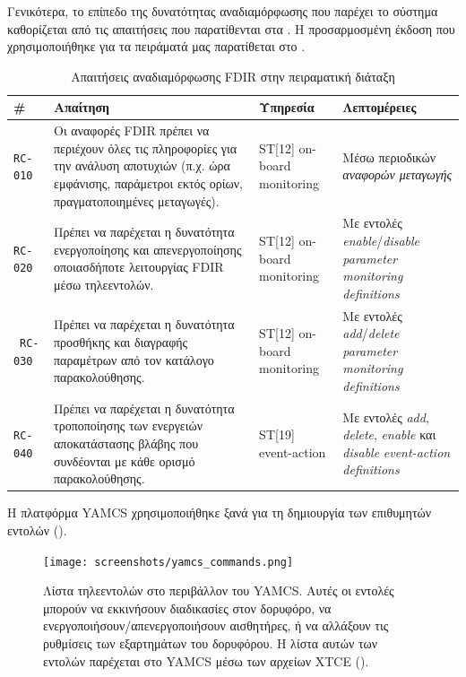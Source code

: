 \documentclass[a4paper,nobib]{tufte-book}
\begin{document}
Γενικότερα, το επίπεδο της δυνατότητας αναδιαμόρφωσης που παρέχει το σύστημα καθορίζεται από τις απαιτήσεις που παρατίθενται στα \cite{ECSS-E-ST-70-11C,SAVOIR-HB-003}. Η προσαρμοσμένη έκδοση που χρησιμοποιήθηκε για τα πειράματά μας παρατίθεται στο .

\begin{table}[h]
	\centering
	\caption{Απαιτήσεις αναδιαμόρφωσης \ac{FDIR} στην πειραματική διάταξη}
	\label{tab:fdir-recon-rq}
	\begin{tabularx}{\textwidth}{@{}lXlL{4cm}@{}}
		\toprule
		\# & Απαίτηση & Υπηρεσία & Λεπτομέρειες \\ \midrule
		\texttt{RC-010} & Οι αναφορές FDIR πρέπει να περιέχουν όλες τις πληροφορίες για την ανάλυση αποτυχιών (π.χ. ώρα εμφάνισης, παράμετροι εκτός ορίων, πραγματοποιημένες μεταγωγές). & ST[12] on-board monitoring & Μέσω περιοδικών \emph{αναφορών μεταγωγής} \\
		\texttt{RC-020} & Πρέπει να παρέχεται η δυνατότητα ενεργοποίησης και απενεργοποίησης οποιασδήποτε λειτουργίας FDIR μέσω τηλεεντολών. & ST[12] on-board monitoring & Με εντολές \emph{enable}/\emph{disable} \emph{parameter monitoring definitions} \\\
		\texttt{RC-030} & Πρέπει να παρέχεται η δυνατότητα προσθήκης και διαγραφής παραμέτρων από τον κατάλογο παρακολούθησης. & ST[12] on-board monitoring & Με εντολές \emph{add}/\emph{delete} \emph{parameter monitoring definitions} \\
		\texttt{RC-040} & Πρέπει να παρέχεται η δυνατότητα τροποποίησης των ενεργειών αποκατάστασης βλάβης που συνδέονται με κάθε ορισμό παρακολούθησης. & ST[19] event-action & Με εντολές \emph{add}, \emph{delete}, \emph{enable} και \emph{disable} \emph{event-action definitions} \\ \bottomrule
	\end{tabularx}
\end{table}

Η πλατφόρμα \ac{YAMCS} χρησιμοποιήθηκε ξανά για τη δημιουργία των επιθυμητών εντολών ().

\begin{figure}[h]
	\texttt{[image: screenshots/yamcs\_commands.png]}
	\caption[Λίστα τηλεεντολών στο περιβάλλον του \acs{YAMCS}]{Λίστα τηλεεντολών στο περιβάλλον του \acs{YAMCS}. Αυτές οι εντολές μπορούν να εκκινήσουν διαδικασίες στον δορυφόρο, να ενεργοποιήσουν/απενεργοποιήσουν αισθητήρες, ή να αλλάξουν τις ρυθμίσεις των εξαρτημάτων του δορυφόρου. Η λίστα αυτών των εντολών παρέχεται στο \acs{YAMCS} μέσω των αρχείων \ac{XTCE} ().}
	\label{fig:yamcs_commands}
\end{figure}
\end{document}
